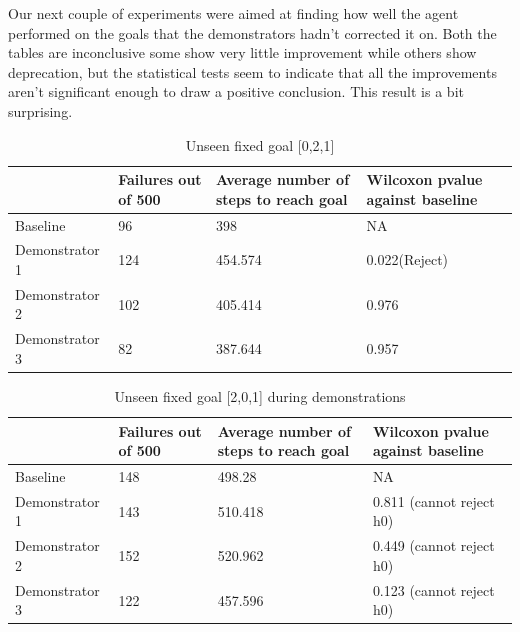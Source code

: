 \documentclass[letterpaper, 12 pt, conference]{ieeeconf}
\begin{document}
Our next couple of experiments were aimed at finding how well the agent performed on the goals that the demonstrators hadn't corrected it on. Both the tables are inconclusive some show very little improvement while others show deprecation, but the statistical tests seem to indicate that all the improvements aren't significant enough to draw a positive conclusion. This result is a bit surprising.
\begin{table}[ht!]
    \caption{Unseen fixed goal [0,2,1]}
    \begin{center}
        \begin{tabular}{|p{2cm}|p{1cm}|p{2cm}|p{2cm}|} 
            \hline
             & Failures out of 500 & Average number of steps to reach goal & Wilcoxon pvalue against baseline \\ \hline
            Baseline & 96 & 398 & NA \\  \hline
            Demonstrator 1 & 124 & 454.574 & 0.022(Reject) \\  \hline
            Demonstrator 2 & 102 & 405.414 & 0.976 \\  \hline
            Demonstrator 3 & 82 & 387.644 & 0.957 \\ \hline
        \end{tabular}
    \end{center}
\end{table}
\begin{table}[ht!]
    \caption{Unseen fixed goal [2,0,1] during demonstrations}
    \begin{center}
        \begin{tabular}{|p{2cm}|p{1cm}|p{2cm}|p{2cm}|} 
            \hline
             & Failures out of 500 & Average number of steps to reach goal & Wilcoxon pvalue against baseline \\ \hline
            Baseline &  148 & 498.28 & NA  \\ \hline
            Demonstrator 1 & 143 & 510.418 & 0.811  (cannot reject h0) \\  \hline
            Demonstrator 2 & 152 & 520.962 & 0.449  (cannot reject h0)\\  \hline
            Demonstrator 3 & 122 & 457.596 & 0.123 (cannot reject h0) \\ \hline
        \end{tabular}
    \end{center}
\end{table}
\end{document}

